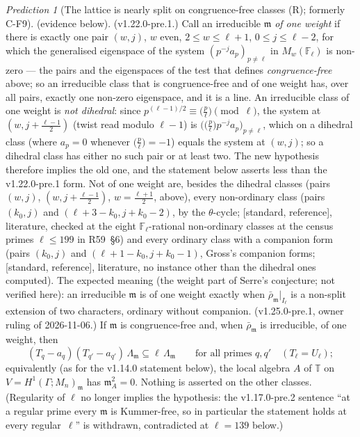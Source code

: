 \documentclass[11pt]{article}
\theoremstyle{remark}
\newtheorem{prediction}[theorem]{Prediction}
\newcommand{\F}{\mathbb{F}}
\newcommand{\Ga}{\Gamma}
\newcommand{\Fl}{\F_\ell}
\newcommand{\T}{\mathbb{T}}
\newcommand{\m}{\mathfrak{m}}
\newcommand{\Mn}{M_n}
\newcommand{\STD}{\textsf{[standard, reference]}}
\begin{document}
\begin{prediction}[The lattice is nearly split on congruence-free classes (R); formerly C-F9]
(evidence below). (v1.22.0-pre.1.)
Call an irreducible $\m$ \emph{of one weight} if there is exactly one pair $(w,j)$, $w$ even, $2\le w\le\ell+1$, $0\le j\le\ell-2$, for which the
generalised eigenspace of the system $(p^{-j}a_p)_{p\ne\ell}$ in $M_w(\Fl)$ is non-zero --- the pairs and the eigenspaces of the test that defines
\emph{congruence-free} above; so an irreducible class that is congruence-free and of one weight has, over all pairs, exactly one non-zero eigenspace,
and it is a line. An irreducible class of one weight is \emph{not dihedral}: since $p^{(\ell-1)/2}\equiv\bigl(\tfrac{p}{\ell}\bigr)\pmod\ell$, the
system at $(w,j+\tfrac{\ell-1}{2})$ (twist read modulo $\ell-1$) is $\bigl(\bigl(\tfrac p\ell\bigr)p^{-j}a_p\bigr)_{p\ne\ell}$, which on a dihedral class
(where $a_p=0$ whenever $\bigl(\tfrac p\ell\bigr)=-1$) equals the system at $(w,j)$; so a dihedral class has either no such pair or at least two.
The new hypothesis therefore implies the old one, and the statement below asserts less than the v1.22.0-pre.1 form. Not of one weight are, besides the
dihedral classes (pairs $(w,j)$, $(w,j+\tfrac{\ell-1}{2})$, $w=\tfrac{\ell+1}2$, above), every non-ordinary class (pairs $(k_0,j)$ and
$(\ell+3-k_0,j+k_0-2)$, by the $\theta$-cycle; \STD, literature, checked at the eight $\Fl$-rational non-ordinary classes at the census primes
$\ell\le199$ in R59~\S6) and every ordinary class with a companion form (pairs $(k_0,j)$ and $(\ell+1-k_0,j+k_0-1)$, Gross's companion forms;
\STD, literature, no instance other than the dihedral ones computed). The expected meaning (the weight part of Serre's conjecture; not verified
here): an irreducible $\m$ is of one weight exactly when $\bar\rho_\m|_{I_\ell}$ is a non-split extension of two characters, ordinary without companion.
(v1.25.0-pre.1, owner ruling of 2026-11-06.)
If $\m$ is congruence-free and, when $\bar\rho_\m$ is irreducible, of one weight, then
\[
  (T_q-a_q)(T_{q'}-a_{q'})\,\Lambda_\m\subseteq\ell\,\Lambda_\m\qquad\text{for all primes }q,q'\quad(T_\ell=U_\ell);
\]
equivalently (as for the v1.14.0 statement below), the local algebra $A$ of $\T$ on $V=H^1(\Ga;\Mn)_\m$ has $\m_A^2=0$. Nothing is asserted on the other
classes. (Regularity of $\ell$ no longer implies the hypothesis: the v1.17.0-pre.2 sentence ``at a regular prime every $\m$ is Kummer-free, so in particular
the statement holds at every regular~$\ell$'' is withdrawn, contradicted at $\ell=139$ below.)


\end{prediction}
\end{document}

